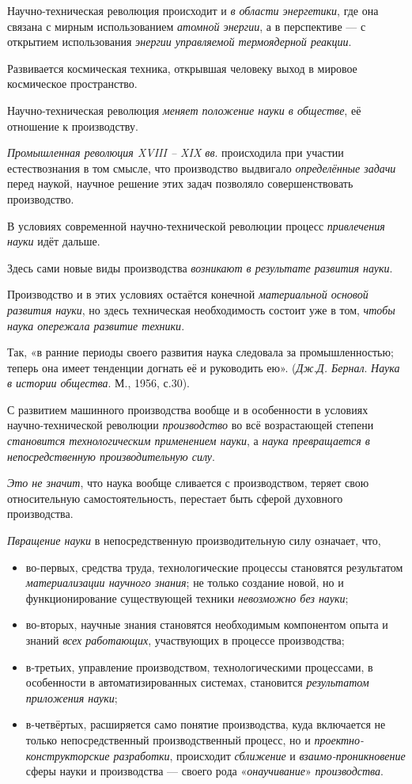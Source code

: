 \documentclass[a4paper,14pt,russian]{extreport}
\begin{document}
Научно-техническая революция происходит и \emph{в области энергетики}, где она связана с мирным использованием \emph{атомной энергии}, а в перспективе --- с открытием использования \emph{энергии управляемой термоядерной реакции}.

Развивается космическая техника, открывшая человеку выход в мировое космическое пространство.

Научно-техническая революция \emph{меняет положение науки в обществе}, её отношение к производству.

\emph{Промышленная революция XVIII -- XIX вв}. происходила при участии естествознания в том смысле, что производство выдвигало \emph{определённые задачи} перед наукой, научное решение этих задач позволяло совершенствовать производство.

В условиях современной научно-технической революции процесс \emph{привлечения науки} идёт дальше.

Здесь сами новые виды производства \emph{возникают в результате развития науки}.

Производство и в этих условиях остаётся конечной \emph{материальной основой развития науки}, но здесь техническая необходимость состоит уже в том, \emph{чтобы наука опережала развитие техники}.

Так, «в ранние периоды своего развития наука следовала за промышленностью; теперь она имеет тенденции догнать её и руководить ею». (\emph{Дж.Д. Бернал}. \emph{Наука в истории общества}. М., 1956, с.30).

С развитием машинного производства вообще и в особенности в условиях научно-технической революции \emph{производство} во всё возрастающей степени \emph{становится технологическим применением науки}, а \emph{наука превращается в непосредственную производительную силу}.

\emph{Это не значит}, что наука вообще сливается с производством, теряет свою относительную самостоятельность, перестает быть сферой духовного производства.

\emph{Пвращение науки} в непосредственную производительную силу означает, что,

\begin{itemize}
\item во-первых, средства труда, технологические процессы становятся результатом \emph{материализации научного знания}; не только создание новой, но и функционирование существующей техники \emph{невозможно без науки};
\item во-вторых, научные знания становятся необходимым компонентом опыта и знаний \emph{всех работающих}, участвующих в процессе производства;
\item в-третьих, управление производством, технологическими процессами, в особенности в автоматизированных системах, становится \emph{результатом приложения науки};
\item в-четвёртых, расширяется само понятие производства, куда включается не только непосредственный производственный процесс, но и \emph{проектно-конструкторские разработки}, происходит \emph{сближение} и \emph{взаимо-проникновение} сферы науки и производства --- своего рода «\emph{онаучивание}» \emph{производства}.
\end{itemize}
\end{document}
